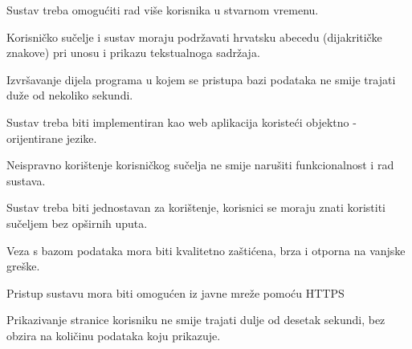 			\begin{packed_item}

				\item{Sustav treba omogućiti rad više korisnika u stvarnom vremenu.}
				\item{Korisničko sučelje i sustav moraju podržavati hrvatsku abecedu (dijakritičke znakove) pri unosu i prikazu tekstualnoga sadržaja.}
				\item{Izvršavanje dijela programa u kojem se pristupa bazi podataka ne smije trajati duže od nekoliko sekundi.}
				\item{Sustav treba biti implementiran kao web aplikacija koristeći objektno - orijentirane jezike.}
				\item{Neispravno korištenje korisničkog sučelja ne smije narušiti funkcionalnost i rad sustava.}
				\item{Sustav treba biti jednostavan za korištenje, korisnici se moraju znati koristiti sučeljem bez opširnih uputa.}
				\item{Veza s bazom podataka mora biti kvalitetno zaštićena, brza i otporna na vanjske greške.}
				\item{Pristup sustavu mora biti omogućen iz javne mreže pomoću HTTPS}
				\item{Prikazivanje stranice korisniku ne smije trajati dulje od desetak sekundi, bez obzira na količinu podataka koju prikazuje.}

			\end{packed_item}
			 
	